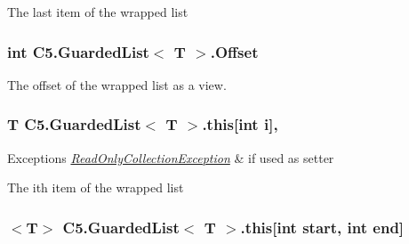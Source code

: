 The last item of the wrapped list\hypertarget{class_c5_1_1_guarded_list_afcec36d0e79fd5634866b62065f51d49}{}
\subsubsection[{Offset}]{\setlength{\rightskip}{0pt plus 5cm}int {\bf C5.\+Guarded\+List}$<$ T $>$.Offset\hspace{0.3cm}{\ttfamily [get]}}\label{class_c5_1_1_guarded_list_afcec36d0e79fd5634866b62065f51d49}




The offset of the wrapped list as a view.\hypertarget{class_c5_1_1_guarded_list_ad5bc647309e81616d984c7713e4c84ff}{}
\subsubsection[{this[int i]}]{\setlength{\rightskip}{0pt plus 5cm}T {\bf C5.\+Guarded\+List}$<$ T $>$.this\mbox{[}int i\mbox{]}\hspace{0.3cm}{\ttfamily [get]}, {\ttfamily [set]}}\label{class_c5_1_1_guarded_list_ad5bc647309e81616d984c7713e4c84ff}





\begin{DoxyExceptions}{Exceptions}
{\em \hyperlink{class_c5_1_1_read_only_collection_exception}{Read\+Only\+Collection\+Exception}} & if used as setter\\
\hline
\end{DoxyExceptions}


The i\textquotesingle{}th item of the wrapped list\hypertarget{class_c5_1_1_guarded_list_a3aa22d62b09f2a0180cc5c1342eb4ce4}{}
\subsubsection[{this[int start, int end]}]{$<$T$>$ {\bf C5.\+Guarded\+List}$<$ T $>$.this\mbox{[}int start, int end\mbox{]}\hspace{0.3cm}{\ttfamily [get]}}\label{class_c5_1_1_guarded_list_a3aa22d62b09f2a0180cc5c1342eb4ce4}





